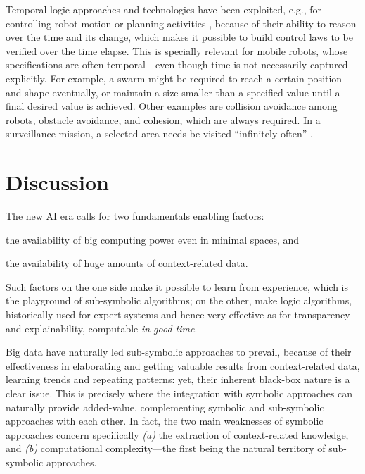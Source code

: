 \documentclass[12pt,a4paper,openright,twoside]{book}
\begin{document}
Temporal logic approaches and technologies have been exploited, e.g., for controlling robot motion or planning activities \cite{finucane2010,fainekos2009}, because of their ability to reason over the time and its change, which makes it possible to build control laws to be verified over the time elapse.
%
This is specially relevant for mobile robots, whose specifications are often temporal---even though time is not necessarily captured explicitly.
%
For example, a swarm might be required to reach a certain position and shape eventually, or maintain a size smaller than a specified value until a final desired value is achieved.
%
Other examples are collision avoidance among robots, obstacle avoidance, and cohesion, which are always required.
%
In a surveillance mission, a selected area needs be visited ``infinitely often'' \cite{Kloetzer2007}.

\section{Discussion}

The new AI era calls for two fundamentals enabling factors:
%
\begin{inlinelist}
    \item the availability of big computing power even in minimal spaces, and
    \item the availability of huge amounts of context-related data.
\end{inlinelist}
%
Such factors on the one side make it possible to learn from experience, which is the playground of  sub-symbolic algorithms; on the other, make logic algorithms, historically used for expert systems and hence very effective as for transparency and explainability, computable \emph{in good time}.

Big data have naturally led sub-symbolic approaches to prevail, because of their effectiveness in elaborating and getting valuable results from context-related data, learning trends and repeating patterns: yet, their inherent black-box nature is a clear issue.
%
This is precisely where the integration with symbolic approaches can naturally provide added-value, complementing symbolic and sub-symbolic approaches with each other.
In fact, the two main weaknesses of symbolic approaches concern specifically \textit{(a)} the extraction of context-related knowledge, and \textit{(b)} computational complexity---the first being the natural territory of sub-symbolic approaches.
\end{document}
